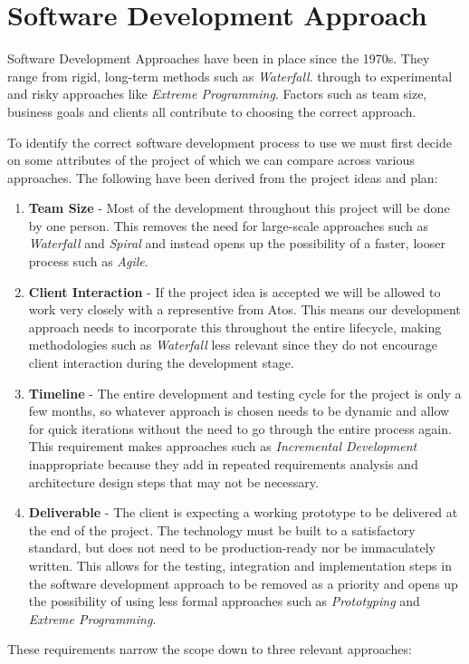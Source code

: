 \section{Software Development Approach}

Software Development Approaches have been in place since the 1970s. They range from rigid, long-term methods such as \emph{Waterfall}. through to experimental and risky approaches like \emph{Extreme Programming}. Factors such as team size, business goals and clients all contribute to choosing the correct approach.

To identify the correct software development process to use we must first decide on some attributes of the project of which we can compare across various approaches. The following have been derived from the project ideas and plan:

\begin{enumerate}
  \item \textbf{Team Size} -
    Most of the development throughout this project will be done by one person. This removes the need for large-scale approaches such as \emph{Waterfall} and \emph{Spiral} and instead opens up the possibility of a faster, looser process such as \emph{Agile}.
  \item \textbf{Client Interaction} - 
    If the project idea is accepted we will be allowed to work very closely with a representive from Atos. This means our development approach needs to incorporate this throughout the entire lifecycle, making methodologies such as \emph{Waterfall} less relevant since they do not encourage client interaction during the development stage.
  \item \textbf{Timeline} - 
    The entire development and testing cycle for the project is only a few months, so whatever approach is chosen needs to be dynamic and allow for quick iterations without the need to go through the entire process again. This requirement makes approaches such as \emph{Incremental Development} inappropriate because they add in repeated requirements analysis and architecture design steps that may not be necessary.
  \item \textbf{Deliverable} -
    The client is expecting a working prototype to be delivered at the end of the project. The technology must be built to a satisfactory standard, but does not need to be production-ready nor be immaculately written. This allows for the testing, integration and implementation steps in the software development approach to be removed as a priority and opens up the possibility of using less formal approaches such as \emph{Prototyping} and \emph{Extreme Programming}.
\end{enumerate}
These requirements narrow the scope down to three relevant approaches:

